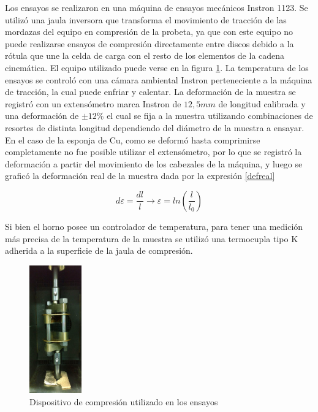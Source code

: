 \documentclass[a4paper,12pt,fleqn,twoside,openany]{book}
\begin{document}
Los ensayos se realizaron en una máquina de ensayos mecánicos Instron 1123. Se utilizó una jaula inversora que transforma el movimiento de tracción de las mordazas del equipo en compresión de la probeta, ya que con este equipo no puede realizarse ensayos de compresión directamente entre discos debido a la rótula que une la celda de carga con el resto de los elementos de la cadena cinemática. El equipo utilizado puede verse en la figura \ref{fig:jaula}. La 
temperatura de los ensayos se controló con una cámara ambiental Instron 
perteneciente a la máquina de tracción, la cual puede enfriar y calentar.
La deformación de la muestra se registró con un extensómetro marca Instron de $12,5 mm$ de longitud calibrada y una deformación de $\pm 12\%$ el cual se fija a la muestra utilizando combinaciones de 
resortes de distinta longitud dependiendo del diámetro de la muestra a ensayar. En el caso de la esponja de Cu, como se deformó hasta comprimirse 
completamente no fue posible utilizar el extensómetro, por lo que se registró la deformación a partir del movimiento de los cabezales de la máquina, y luego 
se graficó la deformación real de la muestra dada por la expresión \ref{defreal}

\begin{equation}
d \varepsilon = \frac{dl}{l}  \longrightarrow  \varepsilon =ln \left(\frac{l}{l_0}\right) \label{defreal} 
\end{equation}


Si bien el horno posee un controlador de temperatura, para tener una medición
más precisa de la temperatura de la muestra se utilizó una termocupla tipo K adherida a la superficie de la jaula de compresión.

\begin{figure}[h]
 \centering
 \includegraphics[width=0.2\textwidth]{Img/Procedimiento/jaula.jpg}
 \caption{Dispositivo de compresión utilizado en los ensayos} 
 \label{fig:jaula}
 \end{figure}
\end{document}
